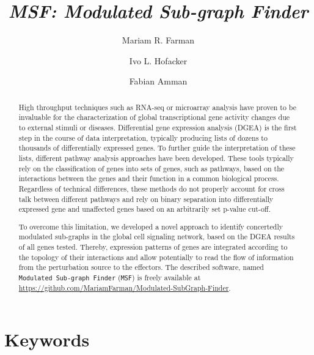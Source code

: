 \documentclass[10pt,a4paper,twocolumn]{article}
\begin{document}
\title{\textit{MSF: Modulated Sub-graph Finder} }

\author[1]{Mariam R. Farman}
\author[1]{Ivo L. Hofacker}
\author[1,2]{Fabian Amman}



\maketitle
\thispagestyle{fancy}

\begin{abstract}

High throughput techniques such as RNA-seq or microarray analysis have
proven to be invaluable for the characterization of global transcriptional
gene activity changes due to external stimuli or diseases. Differential
gene expression analysis (DGEA) is the first step in the course of data
interpretation, typically producing lists of dozens to thousands of
differentially expressed genes. To further guide the interpretation of
these lists, different pathway analysis approaches have been
developed. These tools typically rely on the classification of genes into
sets of genes, such as pathways, based on the interactions between the genes
and their function in a common biological process. Regardless of technical
differences, these methods do not properly account for cross talk between
different pathways and rely on binary separation into differentially
expressed gene and unaffected genes based on an arbitrarily set p-value
cut-off.

To overcome this limitation, we developed a novel approach to identify
concertedly modulated sub-graphs in the global cell signaling network,
based on the DGEA results of all genes tested. Thereby, expression patterns
of genes are integrated according to the topology of their interactions and
allow potentially to read the flow of information from the perturbation
source to the effectors. The described software, named \texttt{Modulated
  Sub-graph Finder} (\texttt{MSF}) is freely available at
\url{https://github.com/MariamFarman/Modulated-SubGraph-Finder}.

\end{abstract}

\section*{Keywords}
\end{document}
